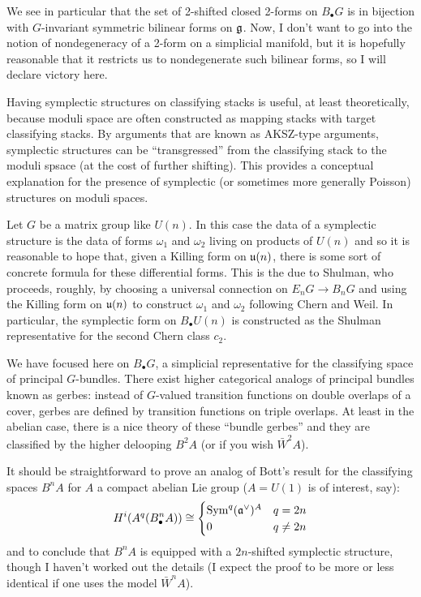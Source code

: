 \documentclass{amsart}
\begin{document}
We see in particular that the set of 2-shifted closed 2-forms
on $B_\bullet G$ is in bijection with 
$G$-invariant symmetric bilinear forms on $\mathfrak g$.
Now, I don't want to go into the notion of nondegeneracy of a 2-form on a 
simplicial manifold, but it is hopefully reasonable that it restricts us to 
nondegenerate such bilinear forms, so I will declare victory here.

Having symplectic structures on classifying stacks is useful, at least 
theoretically, because moduli space are often constructed as mapping stacks with 
target classifying stacks. By arguments that are known as AKSZ-type arguments, 
symplectic structures can be ``transgressed'' from the classifying stack to the 
moduli spsace (at the cost of further shifting). This provides a conceptual 
explanation for the presence of symplectic (or sometimes more generally Poisson) 
structures on moduli spaces.

\begin{remark}
    Let $G$ be a matrix group like $U(n)$.
    In this case the data of a symplectic structure is the data of forms 
    $\omega_1$ and $\omega_2$ living on products of $U(n)$ and so it is 
    reasonable to hope that, given a Killing form on $\mathfrak{u}(n)$, there is some 
    sort of concrete formula for these differential forms.
    This is the due to Shulman, who proceeds, roughly, by 
    choosing a universal connection on $E_nG\to B_nG$ and using the Killing form 
    on $\mathfrak{u}(n)$ to construct $\omega_1$ and $\omega_2$ following Chern and 
    Weil. In particular, the symplectic form on $B_\bullet U(n)$ is constructed 
    as the Shulman representative for the second Chern class $c_2$.
\end{remark}

\begin{remark}
    We have focused here on $B_\bullet G$, a simplicial representative for the 
    classifying space of principal $G$-bundles. There exist higher categorical 
    analogs of principal bundles known as gerbes: instead of $G$-valued 
    transition functions on double overlaps of a cover, gerbes are defined by 
    transition functions on triple overlaps. At least in the abelian case, there 
    is a nice theory of these ``bundle gerbes'' and they are classified by the 
    higher delooping $B^2A$ (or if you wish $\bar W^2A$).

    It should be straightforward to prove an analog of Bott's result for the
    classifying spaces $B^nA$ for 
    $A$ a compact abelian Lie group ($A=U(1)$ is of interest, say):
    \begin{equation*}
        H^i(A^q(B^n_\bullet A)) \cong
        \begin{cases}
            \operatorname{Sym}^q(\mathfrak a^\vee)^A & q = 2n \\
            0 & q \neq 2n
        \end{cases}
    \end{equation*}
    and to conclude that $B^nA$ is equipped with a $2n$-shifted symplectic 
    structure, though I haven't worked out the details (I expect the proof to be 
    more or less identical if one uses the model $\bar W^nA$).
\end{remark}
\end{document}
